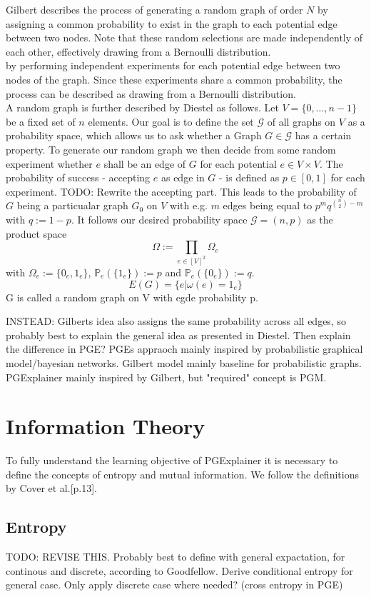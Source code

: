 Gilbert\cite{} describes the process of generating a random graph of order $N$ by assigning a common probability to exist in the graph to each potential edge between two nodes. Note that these random selections are made independently of each other, effectively drawing from a Bernoulli distribution. \\
by performing independent experiments for each potential edge between two nodes of the graph. Since these experiments share a common probability, the process can be described as drawing from a Bernoulli distribution. \\
A random graph is further described by Diestel\cite{} as follows. Let $V = \{0,...,n-1\}$ be a fixed set of $n$ elements. Our goal is to define the set $\mathcal{G}$ of all graphs on $V$ as a probability space, which allows us to ask whether a Graph $G \in \mathcal{G}$ has a certain property. To generate our random graph we then decide from some random experiment whether $e$ shall be an edge of $G$ for each potential $e \in V \times V$. The probability of success - accepting $e$ as edge in $G$ - is defined as $p \in [0,1]$ for each experiment. TODO: Rewrite the accepting part. This leads to the probability of $G$ being a particualar graph $G_0$ on $V$ with e.g. $m$ edges being equal to $p^m q^{\binom{n}{2}-m}$ with $q:=1-p$. It follows our desired probability space $\mathcal{G}=(n,p)$ as the product space
$$\Omega := \prod_{e \in [V]^2} \Omega_e$$ with $\Omega_e := \{0_e,1_e\}$, $\mathbb{P}_e(\{1_e\}) := p$ and $\mathbb{P}_e(\{0_e\}) := q$.
$$E(G) = \{e | \omega(e) = 1_e\}$$
G is called a random graph on V with egde probability p. \bigskip

INSTEAD: Gilberts idea also assigns the same probability across all edges, so probably best to explain the general idea as presented in Diestel. Then explain the difference in PGE? PGEs appraoch mainly inspired by probabilistic graphical model/bayesian networks. Gilbert model mainly baseline for probabilistic graphs. PGExplainer mainly inspired by Gilbert, but "required" concept is PGM.

\section{Information Theory}
To fully understand the learning objective of PGExplainer it is necessary to define the concepts of entropy and mutual information. We follow the definitions by Cover et al.\cite{Cover2005}[p.13].

\subsection{Entropy}
TODO: REVISE THIS. Probably best to define with general expactation, for continous and discrete, according to Goodfellow. Derive conditional entropy for general case. Only apply discrete case where needed? (cross entropy in PGE) \bigskip

